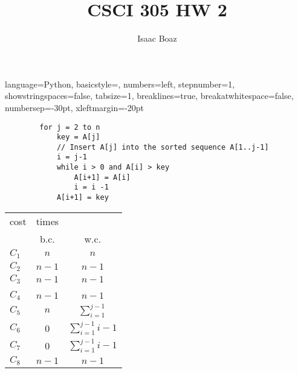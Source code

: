 \documentclass{article}
\title{CSCI 305 HW 2}
\author{Isaac Boaz}
\begin{document}
\maketitle


\lstset
{ %
    language=Python,
    basicstyle=\footnotesize,
    numbers=left,
    stepnumber=1,
    showstringspaces=false,
    tabsize=1,
    breaklines=true,
    breakatwhitespace=false,
    numbersep=-30pt,
    xleftmargin=-20pt
}

\setlength{\columnseprule}{0.5pt}

\begin{multicols}{2}
    \null
    \begin{lstlisting}
        for j = 2 to n
            key = A[j]
            // Insert A[j] into the sorted sequence A[1..j-1]
            i = j-1
            while i > 0 and A[i] > key
                A[i+1] = A[i]
                i = i -1
            A[i+1] = key
    \end{lstlisting}
    \columnbreak
    \footnotesize
    \begin{tabular}{lcc}
        cost  & times &                         \\
              & b.c.  & w.c.                    \\
        $C_1$ & $n$   & $n$                     \\
        $C_2$ & $n-1$ & $n-1$                   \\
        $C_3$ & $n-1$ & $n-1$                   \\
        \\
        $C_4$ & $n-1$ & $n-1$                   \\
        $C_5$ & $n$   & $\sum_{i=1}^{j-1}$      \\
        $C_6$ & 0     & $\sum_{i=1}^{j-1}{i-1}$ \\
        $C_7$ & 0     & $\sum_{i=1}^{j-1}{i-1}$ \\
        $C_8$ & $n-1$ & $n-1$
    \end{tabular}
\end{multicols}
\end{document}
